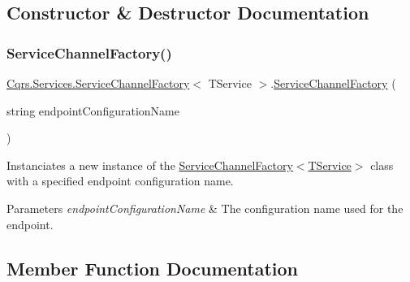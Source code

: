 \subsection{Constructor \& Destructor Documentation}
\mbox{\label{classCqrs_1_1Services_1_1ServiceChannelFactory_a8b483162bcc271fa8212c72e13e28f55_a8b483162bcc271fa8212c72e13e28f55}} 
\subsubsection{\texorpdfstring{Service\+Channel\+Factory()}{ServiceChannelFactory()}}
{\footnotesize\ttfamily \hyperlink{classCqrs_1_1Services_1_1ServiceChannelFactory}{Cqrs.\+Services.\+Service\+Channel\+Factory}$<$ T\+Service $>$.\hyperlink{classCqrs_1_1Services_1_1ServiceChannelFactory}{Service\+Channel\+Factory} (\begin{DoxyParamCaption}\item[{string}]{endpoint\+Configuration\+Name }\end{DoxyParamCaption})}



Instanciates a new instance of the \hyperlink{classCqrs_1_1Services_1_1ServiceChannelFactory_a8b483162bcc271fa8212c72e13e28f55_a8b483162bcc271fa8212c72e13e28f55}{Service\+Channel\+Factory$<$\+T\+Service$>$} class with a specified endpoint configuration name. 


\begin{DoxyParams}{Parameters}
{\em endpoint\+Configuration\+Name} & The configuration name used for the endpoint.\\
\hline
\end{DoxyParams}


\subsection{Member Function Documentation}
\mbox{\label{classCqrs_1_1Services_1_1ServiceChannelFactory_a90572d83f68b4ba72687bb8c755b0845_a90572d83f68b4ba72687bb8c755b0845}} 
